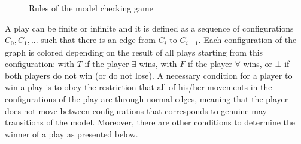 \documentclass{llncs}
\begin{document}
\vspace*{-0.5cm}
\begin{figure}[h]
\begin{center}
\end{center}
\vspace*{-0.5cm}
\caption{Rules of the model checking game}
\label{figRules1}
\end{figure}
\vspace*{-0.5cm}

A play can be finite or infinite and it is defined as a sequence of configurations $C_{0}, C_{1}, ...$ such that there is an edge from $C_{i}$ to $C_{i+1}$. Each configuration of the graph is colored depending on the result of all plays starting from this configuration: with $T$ if the player $\exists$ wins, with $F$ if the player $\forall$ wins, or $\bot$ if both players do not win (or do not lose). A necessary condition for a player to win a play is to obey the restriction that all of his/her movements in the configurations of the play are through normal edges, meaning that the player does not move between configurations that corresponds to genuine may transitions of the model. Moreover, there are other conditions to determine the winner of a play as presented below.
\end{document}
